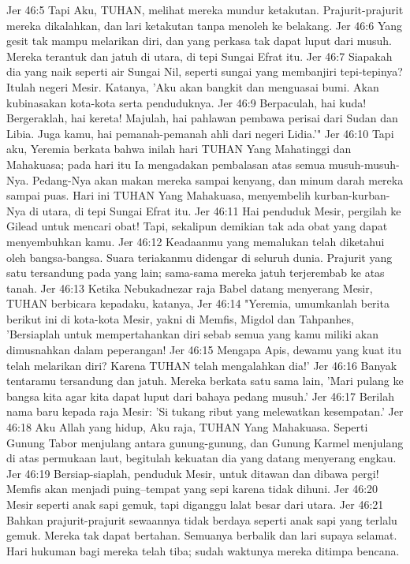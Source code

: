Jer 46:5  Tapi Aku, TUHAN, melihat mereka mundur ketakutan. Prajurit-prajurit mereka dikalahkan, dan lari ketakutan tanpa menoleh ke belakang.
Jer 46:6  Yang gesit tak mampu melarikan diri, dan yang perkasa tak dapat luput dari musuh. Mereka terantuk dan jatuh di utara, di tepi Sungai Efrat itu.
Jer 46:7  Siapakah dia yang naik seperti air Sungai Nil, seperti sungai yang membanjiri tepi-tepinya? Itulah negeri Mesir. Katanya, 'Aku akan bangkit dan menguasai bumi. Akan kubinasakan kota-kota serta penduduknya.
Jer 46:9  Berpaculah, hai kuda! Bergeraklah, hai kereta! Majulah, hai pahlawan pembawa perisai dari Sudan dan Libia. Juga kamu, hai pemanah-pemanah ahli dari negeri Lidia.'"
Jer 46:10  Tapi aku, Yeremia berkata bahwa inilah hari TUHAN Yang Mahatinggi dan Mahakuasa; pada hari itu Ia mengadakan pembalasan atas semua musuh-musuh-Nya. Pedang-Nya akan makan mereka sampai kenyang, dan minum darah mereka sampai puas. Hari ini TUHAN Yang Mahakuasa, menyembelih kurban-kurban-Nya di utara, di tepi Sungai Efrat itu.
Jer 46:11  Hai penduduk Mesir, pergilah ke Gilead untuk mencari obat! Tapi, sekalipun demikian tak ada obat yang dapat menyembuhkan kamu.
Jer 46:12  Keadaanmu yang memalukan telah diketahui oleh bangsa-bangsa. Suara teriakanmu didengar di seluruh dunia. Prajurit yang satu tersandung pada yang lain; sama-sama mereka jatuh terjerembab ke atas tanah.
Jer 46:13  Ketika Nebukadnezar raja Babel datang menyerang Mesir, TUHAN berbicara kepadaku, katanya,
Jer 46:14  "Yeremia, umumkanlah berita berikut ini di kota-kota Mesir, yakni di Memfis, Migdol dan Tahpanhes, 'Bersiaplah untuk mempertahankan diri sebab semua yang kamu miliki akan dimusnahkan dalam peperangan!
Jer 46:15  Mengapa Apis, dewamu yang kuat itu telah melarikan diri? Karena TUHAN telah mengalahkan dia!'
Jer 46:16  Banyak tentaramu tersandung dan jatuh. Mereka berkata satu sama lain, 'Mari pulang ke bangsa kita agar kita dapat luput dari bahaya pedang musuh.'
Jer 46:17  Berilah nama baru kepada raja Mesir: 'Si tukang ribut yang melewatkan kesempatan.'
Jer 46:18  Aku Allah yang hidup, Aku raja, TUHAN Yang Mahakuasa. Seperti Gunung Tabor menjulang antara gunung-gunung, dan Gunung Karmel menjulang di atas permukaan laut, begitulah kekuatan dia yang datang menyerang engkau.
Jer 46:19  Bersiap-siaplah, penduduk Mesir, untuk ditawan dan dibawa pergi! Memfis akan menjadi puing--tempat yang sepi karena tidak dihuni.
Jer 46:20  Mesir seperti anak sapi gemuk, tapi diganggu lalat besar dari utara.
Jer 46:21  Bahkan prajurit-prajurit sewaannya tidak berdaya seperti anak sapi yang terlalu gemuk. Mereka tak dapat bertahan. Semuanya berbalik dan lari supaya selamat. Hari hukuman bagi mereka telah tiba; sudah waktunya mereka ditimpa bencana.

